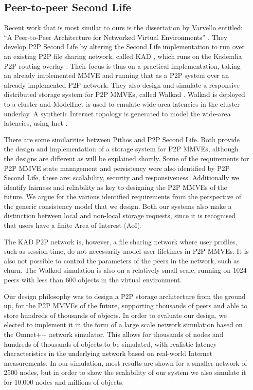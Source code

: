 \subsection{Peer-to-peer Second Life}
Recent work that is most similar to ours is the dissertation by Varvello entitled: ``A Peer-to-Peer Architecture for Networked Virtual Environments'' \cite{varvello_phd}. They develop P2P Second Life by altering the Second Life implementation to run over an existing P2P file sharing network, called KAD \cite{KAD_Steiner}, which runs on the Kademlia P2P routing overlay \cite{Kademlia_Maymounkov}. Their focus is thus on a practical implementation, taking an already implemented MMVE and running that as a P2P system over an already implemented P2P network. They also design and simulate a responsive distributed storage system for P2P MMVEs, called Walkad \cite{Walkad_Varvello}. Walkad is deployed to a cluster and ModelInet \cite{ModelInet_Vahdat} is used to emulate wide-area latencies in the cluster underlay. A synthetic Internet topology is generated to model the wide-area latencies, using Inet \cite{Inet_warwick_jamin}.

There are some similarities between Pithos and P2P Second Life. Both provide the design and implementation of a storage system for P2P MMVEs, although the designs are different as will be explained shortly. Some of the requirements for P2P MMVE state management and persistency were also identified by P2P Second Life, these are: scalability, security and responsiveness. Additionally we identify fairness and reliability as key to designing the P2P MMVEs of the future. We argue for the various identified requirements from the perspective of the generic consistency model that we design. Both our systems also make a distinction between local and non-local storage requests, since it is recognised that users have a finite Area of Interest (AoI).

The KAD P2P network is, however, a file sharing network where user profiles, such as session time, do not necessarily model user lifetimes in P2P MMVEs. It is also not possible to control the parameters of the peers in the network, such as churn. The Walkad simulation is also on a relatively small scale, running on 1024 peers with less than 600 objects in the virtual environment.

Our design philosophy was to design a P2P storage architecture from the ground up, for the P2P MMVEs of the future, supporting thousands of peers and able to store hundreds of thousands of objects. In order to evaluate our design, we elected to implement it in the form of a large scale network simulation based on the Omnet++ network simulator. This allows for thousands of nodes and hundreds of thousands of objects to be simulated, with realistic latency characteristics in the underlying network based on real-world Internet measurements. In our simulation, most results are shown for a smaller network of 2500 nodes, but in order to show the scalability of our system we also simulate it for 10,000 nodes and millions of objects.

